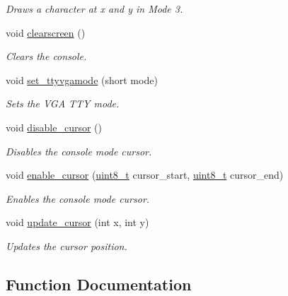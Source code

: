 \begin{DoxyCompactItemize}
\begin{DoxyCompactList}\small\item\em Draws a character at x and y in Mode 3. \end{DoxyCompactList}\item 
void \hyperlink{a00170_aff4bc17c602603d120756f52e18ebb96_aff4bc17c602603d120756f52e18ebb96}{clearscreen} ()
\begin{DoxyCompactList}\small\item\em Clears the console. \end{DoxyCompactList}\item 
void \hyperlink{a00170_aaf55ee008e2e63ca97eacae371646db7_aaf55ee008e2e63ca97eacae371646db7}{set\+\_\+ttyvgamode} (short mode)
\begin{DoxyCompactList}\small\item\em Sets the V\+GA T\+TY mode. \end{DoxyCompactList}\item 
void \hyperlink{a00170_a3d09038c7b6436e60b228f2f3f451f6a_a3d09038c7b6436e60b228f2f3f451f6a}{disable\+\_\+cursor} ()
\begin{DoxyCompactList}\small\item\em Disables the console mode cursor. \end{DoxyCompactList}\item 
void \hyperlink{a00170_afe197dc4dbfa6036ef04abd2aeeeca2d_afe197dc4dbfa6036ef04abd2aeeeca2d}{enable\+\_\+cursor} (\hyperlink{a00134_aba7bc1797add20fe3efdf37ced1182c5_aba7bc1797add20fe3efdf37ced1182c5}{uint8\+\_\+t} cursor\+\_\+start, \hyperlink{a00134_aba7bc1797add20fe3efdf37ced1182c5_aba7bc1797add20fe3efdf37ced1182c5}{uint8\+\_\+t} cursor\+\_\+end)
\begin{DoxyCompactList}\small\item\em Enables the console mode cursor. \end{DoxyCompactList}\item 
void \hyperlink{a00170_a492f5021d7340613e732ef37bbaa04e4_a492f5021d7340613e732ef37bbaa04e4}{update\+\_\+cursor} (int x, int y)
\begin{DoxyCompactList}\small\item\em Updates the cursor position. \end{DoxyCompactList}\end{DoxyCompactItemize}


\subsection{Function Documentation}
\mbox{\label{a00170_aff4bc17c602603d120756f52e18ebb96_aff4bc17c602603d120756f52e18ebb96}} 
